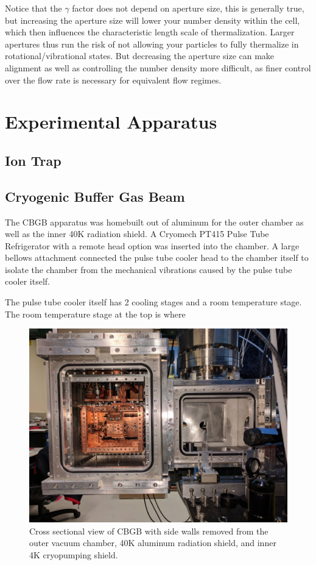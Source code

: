 \documentclass[a4paper]{article}
\begin{document}
Notice that the $\gamma$ factor does not depend on aperture size, this is generally true, but increasing the aperture size will lower your number density within the cell, which then influences the characteristic length scale of thermalization. Larger apertures thus run the risk of not allowing your particles to fully thermalize in rotational/vibrational states. But decreasing the aperture size can make alignment as well as controlling the number density more difficult, as finer control over the flow rate is necessary for equivalent flow regimes.

\section{Experimental Apparatus}
\subsection{Ion Trap}

\subsection{Cryogenic Buffer Gas Beam}

The CBGB apparatus was homebuilt out of aluminum for the outer chamber as well as the inner 40K radiation shield. A Cryomech PT415 Pulse Tube Refrigerator with a remote head option was inserted into the chamber. A large bellows attachment connected the pulse tube cooler head to the chamber itself to isolate the chamber from the mechanical vibrations caused by the pulse tube cooler itself.

The pulse tube cooler itself has 2 cooling stages and a room temperature stage. The room temperature stage at the top is where 

\begin{figure}[H]
\centering
\includegraphics[width=1\textwidth]{apparatus_cross_section.jpg}
\caption{Cross sectional view of CBGB with side walls removed from the outer vacuum chamber, 40K aluminum radiation shield, and inner 4K cryopumping shield.}
\label{f: chamber}
\end{figure}
\end{document}
